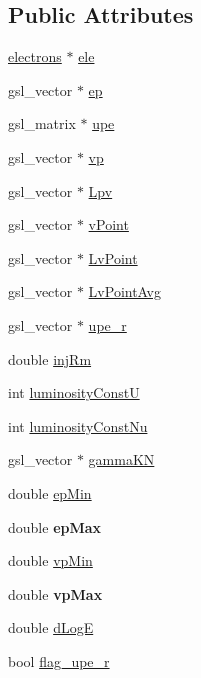 \subsection*{Public Attributes}
\begin{DoxyCompactItemize}
\item 
\hyperlink{classelectrons}{electrons} $\ast$ \hyperlink{classenergyDissProc_a0dbf0777938131e938c1fdad5df38a7f}{ele}
\item 
gsl\-\_\-vector $\ast$ \hyperlink{classenergyDissProc_a36330825cd7737639d5d223281b1c7e1}{ep}
\item 
gsl\-\_\-matrix $\ast$ \hyperlink{classenergyDissProc_aab57bc9681e8de22dc8a311e345bea53}{upe}
\item 
gsl\-\_\-vector $\ast$ \hyperlink{classenergyDissProc_abede39343a0a978c8dc8a064c80d6990}{vp}
\item 
gsl\-\_\-vector $\ast$ \hyperlink{classenergyDissProc_a235e694793915f34234654c58a0316b9}{Lpv}
\item 
gsl\-\_\-vector $\ast$ \hyperlink{classenergyDissProc_a1f075543ccaa902a20787c032822d8f4}{v\-Point}
\item 
gsl\-\_\-vector $\ast$ \hyperlink{classenergyDissProc_aa8463250da28ef23c71540b1efb24ee4}{Lv\-Point}
\item 
gsl\-\_\-vector $\ast$ \hyperlink{classenergyDissProc_a25546d40225b971c1b3dddb8e8f71258}{Lv\-Point\-Avg}
\item 
gsl\-\_\-vector $\ast$ \hyperlink{classenergyDissProc_ac925d66519c79f36421f75a6bc9f0965}{upe\-\_\-r}
\item 
double \hyperlink{classenergyDissProc_af1c1d91f8ef5f49f2f5831776052b651}{inj\-Rm}
\item 
int \hyperlink{classenergyDissProc_a2cc4e4eae15982f977a0dfa5458d80f4}{luminosity\-Const\-U}
\item 
int \hyperlink{classenergyDissProc_a0a23854c1c830dfb9ac33d116fce5b7d}{luminosity\-Const\-Nu}
\item 
gsl\-\_\-vector $\ast$ \hyperlink{classenergyDissProc_a22d892e2e11fc1f161ca3d0267752f9c}{gamma\-K\-N}
\item 
double \hyperlink{classenergyDissProc_a57aee74ef8fc4cb9220127a9c345174a}{ep\-Min}
\item 
\hypertarget{classenergyDissProc_ab55c8eafeef63eaaefe4eb82eef9b440}{double {\bfseries ep\-Max}}\label{classenergyDissProc_ab55c8eafeef63eaaefe4eb82eef9b440}

\item 
double \hyperlink{classenergyDissProc_aafedd3c012010a8e8aa34247660fea3b}{vp\-Min}
\item 
\hypertarget{classenergyDissProc_a5f9e91996d57a55a3508bd5596642a1e}{double {\bfseries vp\-Max}}\label{classenergyDissProc_a5f9e91996d57a55a3508bd5596642a1e}

\item 
double \hyperlink{classenergyDissProc_a270fdc20de5c26f9cc499f28dd32fb7b}{d\-Log\-E}
\item 
bool \hyperlink{classenergyDissProc_a7b51925f603e271657cab66afe822591}{flag\-\_\-upe\-\_\-r}
\end{DoxyCompactItemize}


